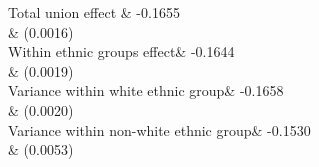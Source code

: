 Total union effect  &     -0.1655\\
                    &    (0.0016)\\

Within ethnic groups effect&     -0.1644\\
                    &    (0.0019)\\

\hspace{6mm} Variance within white ethnic group&     -0.1658\\
                    &    (0.0020)\\

\hspace{6mm} Variance within non-white ethnic group&     -0.1530\\
                    &    (0.0053)\\

